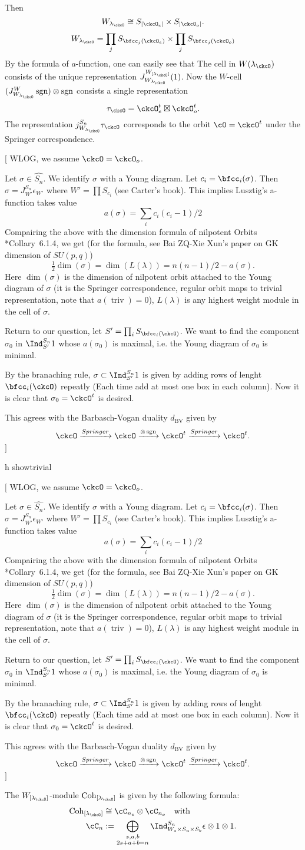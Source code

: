 \documentclass[12pt,a4paper]{amsart}
\newcommand{\trivial}[2][]{\if\relax\detokenize{#1}\relax
  {%
      \color{orange} \vspace{0em} $[$  #2 $]$
      \color{black}
  }
  \else
\ifx#1h
\ifcsname showtrivial\endcsname
{%
    \color{orange} \vspace{0em}  $[$ #2 $]$
    \color{black}
}
\fi
\else {\red Wrong argument!} \fi
\fi
}
\def\abs#1{\left|{#1}\right|}
\newcommand{\sgn}{\operatorname{sgn}}
\newcommand{\triv}{\operatorname{triv}}
\numberwithin{equation}{section}
\theoremstyle{remark}
\def\half{{\tfrac{1}{2}}}
\def\dBV{d_{\mathrm{BV}}}
\def\lamck{\lambda_\ckcO}
\def\Wint#1{W_{[#1]}}
\def\Cint#1{\Coh_{[#1]}}
\def\Coh{\mathrm{Coh}}
\begin{document}
Then 
\[
  W_{\lamck} \cong S_{\abs{\ckcO_e}}\times S_{\abs{\ckcO_o}}.
\]
\[
 W_{\lambda_\ckcO} = \prod_j S_{\bfcc_j(\ckcO_e)}\times \prod_j S_{\bfcc_j(\ckcO_o)} 
\]
By the formula of $a$-function, one can easily see that 
The cell in $W(\lamck)$ consists of the unique representation $J_{W_{\lamck}}^{\Wint{\lamck}} (1)$.
Now the $W$-cell $(J_{W_{\lamck}}^W \sgn)\otimes \sgn$ consists a single
representation
\[
\tau_{\ckcO} = \ckcO_{e}^{t}\boxtimes \ckcO_{o}^{t}.
\]
The representation $j_{W_{\lamck}}^{S_{n}} \tau_{\ckcO}$
corresponds to the orbit $\cO= \ckcO^t $ under the Springer
correspondence.
\trivial{
WLOG, we assume $\ckcO =  \ckcO_o$.

Let $\sigma\in \widehat{S_n}$. We identify $\sigma$ with a Young diagram. 
Let $c_i = \bfcc_i(\sigma)$.
Then $\sigma = J^{S_n}_{W'} \epsilon_{W'}$ where $W' = \prod S_{c_i}$
(see Carter's book). 
This implies Lusztig's a-function takes value
\[
a(\sigma) = \sum_i c_i(c_i-1) /2
\]
Compairing the above with the dimension formula of nilpotent Orbits
\cite{CM}*{Collary~6.1.4}, we get (for the formula, see Bai ZQ-Xie Xun's paper on 
GK dimension of $SU(p,q)$)
\[
\half \dim(\sigma) = \dim(L(\lambda)) = n(n-1)/2 - a(\sigma).
\]
Here $\dim(\sigma)$ is the dimension of nilpotent orbit attached to the Young
diagram of $\sigma$ (it is the Springer correspondence, regular orbit maps to
trivial representation, note that $a(\triv)=0$), $L(\lambda)$ is any highest
weight module in the cell of $\sigma$. 


Return to our question, let $S' = \prod_i S_{\bfcc_i(\ckcO)}$. We want to find
the component $\sigma_0$ in $\Ind_{S'}^{S_n} 1$ whose $a(\sigma_0)$ is maximal,
i.e. the Young diagram of $\sigma_0$ is minimal. 

 By the branaching rule, $\sigma \subset \Ind_{S'}^{S_n} 1$ is given by adding
 rows of lenght $\bfcc_i(\ckcO)$ repeatly (Each time add at most one box in each
 column). 
 Now it is clear that $\sigma_0 = \ckcO^t$ is desired. 

 This agrees with the Barbasch-Vogan duality $\dBV$ given by 
 \[
  \ckcO \xrightarrow{Springer}\ckcO \xrightarrow{\otimes \sgn} \ckcO^t 
  \xrightarrow{Springer} \ckcO^t.
 \]
}

The $\Wint{\lamck}$-module $\Cint{\lamck}$ is given by the following formula:
\[
  \begin{split}
  \Cint{\lamck} &\cong \cC_{n_e}\otimes \cC_{n_o} \quad \text{with} \\ 
 \cC_n &:= \bigoplus_{\substack{s,a,b\\2s+a+b=n}} 
 \Ind_{W_s\times S_a\times S_b}^{S_{n}} \epsilon \otimes 1\otimes 1. %
  \end{split}
\] 
\end{document}
